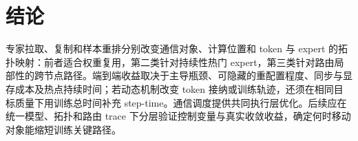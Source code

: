 \section{结论}
\label{sec:conclusion}

专家拉取、复制和样本重排分别改变通信对象、计算位置和 token 与 expert 的拓扑映射：前者适合权重复用，第二类针对持续性热门 expert，第三类针对路由局部性的跨节点路径。端到端收益取决于主导瓶颈、可隐藏的重配置程度、同步与显存成本及热点持续时间；若动态机制改变 token 接纳或训练轨迹，还须在相同目标质量下用训练总时间补充 step-time。通信调度提供共同执行层优化。后续应在统一模型、拓扑和路由 trace 下分层验证控制变量与真实收敛收益，确定何时移动对象能缩短训练关键路径。

